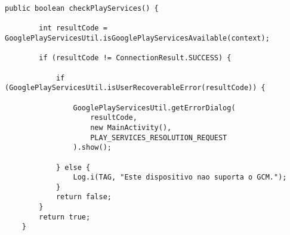 \begin{lstlisting}[style=custom_JAVA]
public boolean checkPlayServices() {

        int resultCode = GooglePlayServicesUtil.isGooglePlayServicesAvailable(context);

        if (resultCode != ConnectionResult.SUCCESS) {

            if (GooglePlayServicesUtil.isUserRecoverableError(resultCode)) {

                GooglePlayServicesUtil.getErrorDialog(
                	resultCode, 
                	new MainActivity(), 
                	PLAY_SERVICES_RESOLUTION_REQUEST
                ).show();

            } else {
                Log.i(TAG, "Este dispositivo nao suporta o GCM.");
            }
            return false;
        }
        return true;
    }
\end{lstlisting}
